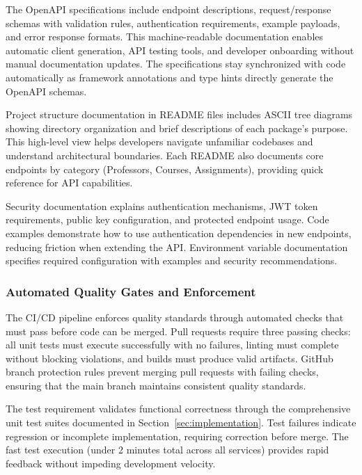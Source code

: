 \documentclass[12pt,a4paper]{article}
\begin{document}
The OpenAPI specifications include endpoint descriptions, request/response schemas with validation rules, authentication requirements, example payloads, and error response formats. This machine-readable documentation enables automatic client generation, API testing tools, and developer onboarding without manual documentation updates. The specifications stay synchronized with code automatically as framework annotations and type hints directly generate the OpenAPI schemas.\newline

Project structure documentation in README files includes ASCII tree diagrams showing directory organization and brief descriptions of each package's purpose. This high-level view helps developers navigate unfamiliar codebases and understand architectural boundaries. Each README also documents core endpoints by category (Professors, Courses, Assignments), providing quick reference for API capabilities.\newline

Security documentation explains authentication mechanisms, JWT token requirements, public key configuration, and protected endpoint usage. Code examples demonstrate how to use authentication dependencies in new endpoints, reducing friction when extending the API. Environment variable documentation specifies required configuration with examples and security recommendations.

\subsubsection{Automated Quality Gates and Enforcement}

The CI/CD pipeline enforces quality standards through automated checks that must pass before code can be merged. Pull requests require three passing checks: all unit tests must execute successfully with no failures, linting must complete without blocking violations, and builds must produce valid artifacts. GitHub branch protection rules prevent merging pull requests with failing checks, ensuring that the main branch maintains consistent quality standards.\newline

The test requirement validates functional correctness through the comprehensive unit test suites documented in Section~\ref{sec:implementation}. Test failures indicate regression or incomplete implementation, requiring correction before merge. The fast test execution (under 2 minutes total across all services) provides rapid feedback without impeding development velocity.\newline
\end{document}
